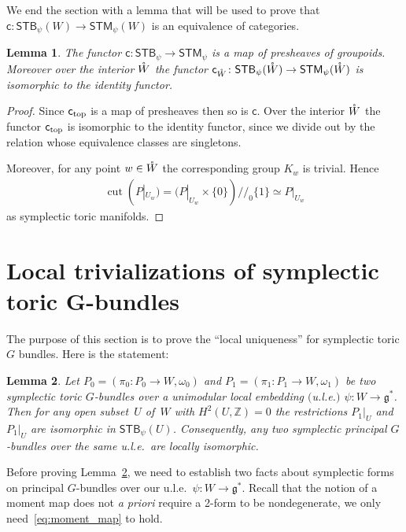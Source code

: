 \documentclass[10pt,a4paper]{amsart}
\numberwithin{equation}{section}
\newtheorem{Lemma}{Lemma}[section]
\begin{document}
We end the section with a lemma that will be used to prove that
$\textsf{c}\colon {\textsf{STB}}_\psi(W)\to {\textsf{STM}}_\psi (W)$ is an equivalence of categories.

\begin{Lemma} \label{lem: c is a map of stacks} The functor
  ${\textsf{c}}\colon {\textsf{STB}}_\psi \to {\textsf{STM}}_\psi$ is a map of presheaves of groupoids.
  Moreover over the interior ${\mathaccent23{W}}$ the functor ${\textsf{c}}_{{\mathaccent23{W}}}\colon
  {\textsf{STB}}_\psi({\mathaccent23{W}}) \to {\textsf{STM}}_\psi({\mathaccent23{W}})$ is isomorphic to the
  identity functor.
\end{Lemma}

\begin{proof}
  Since ${\textsf{c}_{\rm top}}$ is a map of presheaves then so is $\textsf{c}$.  Over the
  interior ${\mathaccent23{W}}$ the functor ${\textsf{c}}_{\rm top}$ is isomorphic to the
  identity functor, since we divide out by the relation whose
  equivalence classes are singletons.

  Moreover, for any point $w\in {\mathaccent23{W}}$ the corresponding group $K_w$
  is trivial.  Hence
\begin{gather*}
\operatorname{cut}(P|_{U_w}) = (P|_{U_w}\times \{0\})/\!/_0 \{1\} \simeq P|_{U_w}
\end{gather*}
as symplectic toric manifolds.
\end{proof}


\section[Local trivializations of symplectic toric $G$-bundles]{Local trivializations of symplectic toric $\boldsymbol{G}$-bundles}
\label{sec:local uniqueness STB}

The purpose of this section is to prove the ``local uniqueness''
for symplectic toric $G$ bundles.  Here is the statement:

\begin{Lemma} \label{loc-iso-stb} Let $P_0 = ( \pi_0 \colon P_0 \to
  W,\omega_0)$ and $P_1 = (\pi_1 \colon P_1 \to W,\omega_1)$ be two
  symplectic toric $G$-bundles over a unimodular local embedding $($u.l.e.$)$
  $\psi \colon W \to {\mathfrak g}^*$.
  Then for any  open subset~$U$ of~$W$ with $H^2(U,{\mathbb Z}) =0$ the
  restrictions $P_1|_U$ and $P_1|_U$ are isomorphic in ${\textsf{STB}}_\psi (U)$.
Consequently, any two  symplectic principal $G$-bundles over the
same u.l.e.\ are locally isomorphic.
\end{Lemma}
Before proving Lemma~\ref{loc-iso-stb}, we need to establish
two facts about symplectic forms on principal  $G$-bundles over our
u.l.e.\ $\psi \colon W \to {\mathfrak g}^*$.  Recall that the notion of a moment map
does not {\em a priori} require a 2-form to be nondegenerate,
we only need~\eqref{eq:moment_map} to hold.
\end{document}
